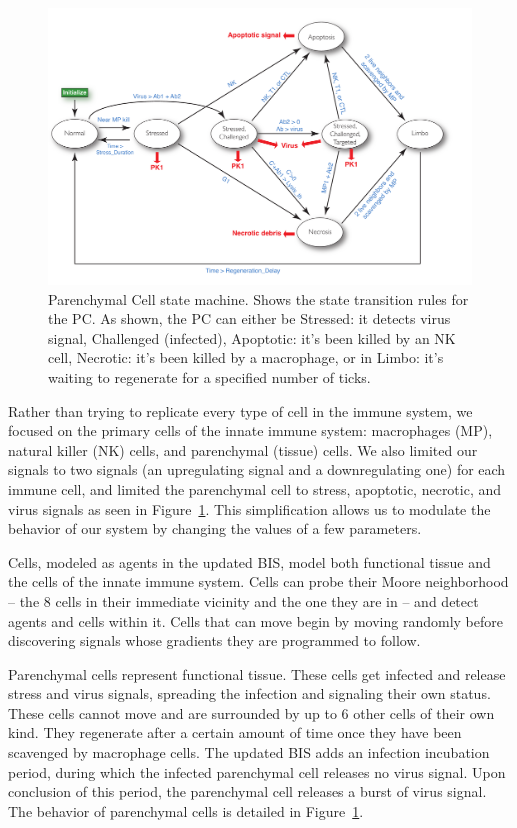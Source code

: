 \documentclass[10pt,conference]{IEEEtran}
\begin{document}
\begin{figure}[h]
\centering
\captionsetup{justification=centering,width=7.0in}
\includegraphics[width=7in]{PC_fsm}
\caption{Parenchymal Cell state machine. Shows the state transition rules for
    the PC\@. As shown, the PC can either be Stressed: it detects virus signal,
    Challenged (infected), Apoptotic: it's been killed by an NK cell, Necrotic:
    it's been killed by a macrophage, or in Limbo: it's waiting to regenerate
    for a specified number of ticks.}
\label{PC_fsm}
\end{figure}
Rather than trying to replicate every type of cell in the immune system, we
focused on the primary cells of the innate immune system: macrophages (MP),
natural killer (NK) cells, and parenchymal (tissue) cells. We also limited our
signals to two signals (an upregulating signal and a downregulating one) for
each immune cell, and limited the parenchymal cell to stress, apoptotic,
necrotic, and virus signals as seen in Figure~\ref{PC_fsm}. This simplification
allows us to modulate the behavior of our system by changing the values of a
few parameters.

Cells, modeled as agents in the updated BIS, model both functional tissue and
the cells of the innate immune system. Cells can probe their Moore neighborhood
-- the 8 cells in their immediate vicinity and the one they are in -- and
detect agents and cells within it. Cells that can move begin by moving randomly
before discovering signals whose gradients they are programmed to follow.

\indent
Parenchymal cells represent functional tissue. These cells get infected and
release stress and virus signals, spreading the infection and signaling their
own status. These cells cannot move and are surrounded by up to 6 other
cells of their own kind. They regenerate after a certain amount of time once
they have been scavenged by macrophage cells. The updated BIS adds an infection
incubation period, during which the infected parenchymal cell releases no virus
signal. Upon conclusion of this period, the parenchymal cell releases a burst
of virus signal. The behavior of parenchymal cells is detailed in
Figure~\ref{PC_fsm}.
\end{document}
